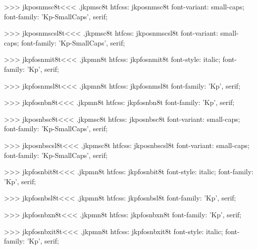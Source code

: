 >>>
\<jkposnmsc8t\><<<
.jkpmsc8t
htfcss:  jkposnmsc8t  font-variant: small-caps; font-family: 'Kp-SmallCaps', serif;

>>>
\<jkposnmscsl8t\><<<
.jkpmsc8t
htfcss:  jkposnmscsl8t  font-variant: small-caps; font-family: 'Kp-SmallCaps', serif;

>>>
\<jkpfosnmit8t\><<<
.jkpmn8t
htfcss:  jkpfosnmit8t  font-style: italic; font-family: 'Kp', serif;

>>>
\<jkpfosnmsl8t\><<<
.jkpmn8t
htfcss:  jkpfosnmsl8t  font-family: 'Kp', serif;

>>>
\<jkpfosnbn8t\><<<
.jkpmn8t
htfcss:  jkpfosnbn8t  font-family: 'Kp', serif;

>>>
\<jkposnbsc8t\><<<
.jkpmsc8t
htfcss:  jkposnbsc8t  font-variant: small-caps; font-family: 'Kp-SmallCaps', serif;

>>>
\<jkposnbscsl8t\><<<
.jkpmsc8t
htfcss:  jkposnbscsl8t  font-variant: small-caps; font-family: 'Kp-SmallCaps', serif;

>>>
\<jkpfosnbit8t\><<<
.jkpmn8t
htfcss:  jkpfosnbit8t  font-style: italic; font-family: 'Kp', serif;

>>>
\<jkpfosnbsl8t\><<<
.jkpmn8t
htfcss:  jkpfosnbsl8t  font-family: 'Kp', serif;

>>>
\<jkpfosnbxn8t\><<<
.jkpmn8t
htfcss:  jkpfosnbxn8t  font-family: 'Kp', serif;

>>>
\<jkpfosnbxit8t\><<<
.jkpmn8t
htfcss:  jkpfosnbxit8t  font-style: italic; font-family: 'Kp', serif;

